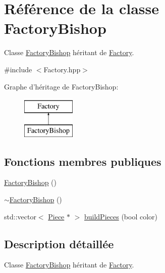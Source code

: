 \hypertarget{class_factory_bishop}{\section{Référence de la classe Factory\-Bishop}
\label{class_factory_bishop}
}


Classe \hyperlink{class_factory_bishop}{Factory\-Bishop} héritant de \hyperlink{class_factory}{Factory}.  




{\ttfamily \#include $<$Factory.\-hpp$>$}

Graphe d'héritage de Factory\-Bishop\-:\begin{figure}[H]
\begin{center}
\leavevmode
\includegraphics[height=2.000000cm]{class_factory_bishop}
\end{center}
\end{figure}
\subsection*{Fonctions membres publiques}
\begin{DoxyCompactItemize}
\item 
\hyperlink{class_factory_bishop_a6452991e628ec8262c57318da26171f1}{Factory\-Bishop} ()
\item 
\hyperlink{class_factory_bishop_aacec6859e5c70571357c5d172a62a38e}{$\sim$\-Factory\-Bishop} ()
\item 
std\-::vector$<$ \hyperlink{class_piece}{Piece} $\ast$ $>$ \hyperlink{class_factory_bishop_a501a01fc371b26931d528ea0aa8b5c14}{build\-Pieces} (bool color)
\end{DoxyCompactItemize}


\subsection{Description détaillée}
Classe \hyperlink{class_factory_bishop}{Factory\-Bishop} héritant de \hyperlink{class_factory}{Factory}. 

